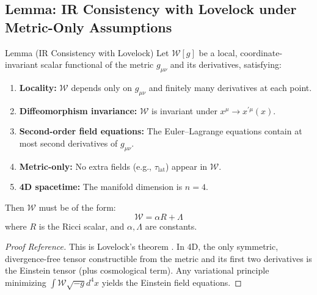 
\subsection{Lemma: IR Consistency with Lovelock under Metric-Only Assumptions}
\label{lemma:lovelock-consistency}

\begin{mytheorem}{Lemma (IR Consistency with Lovelock)}
\label{lemma:lovelock}
Let $\mathcal{W}[g]$ be a local, coordinate-invariant scalar functional of the metric $g_{\mu\nu}$ and its derivatives, satisfying:
\begin{enumerate}[label=(L\arabic*)]
    \item \textbf{Locality:} $\mathcal{W}$ depends only on $g_{\mu\nu}$ and finitely many derivatives at each point.
    \item \textbf{Diffeomorphism invariance:} $\mathcal{W}$ is invariant under $x^\mu \to x^{\prime\mu}(x)$.
    \item \textbf{Second-order field equations:} The Euler--Lagrange equations contain at most second derivatives of $g_{\mu\nu}$.
    \item \textbf{Metric-only:} No extra fields (e.g., $\tau_{\mathrm{lat}}$) appear in $\mathcal{W}$.
    \item \textbf{4D spacetime:} The manifold dimension is $n=4$.
\end{enumerate}
Then $\mathcal{W}$ must be of the form:
\begin{equation}
\mathcal{W} = \alpha R + \Lambda
\end{equation}
where $R$ is the Ricci scalar, and $\alpha, \Lambda$ are constants.
\end{mytheorem}

\begin{proof}[Proof Reference]
This is Lovelock's theorem \cite{Lovelock1971}. In 4D, the only symmetric, divergence-free tensor constructible from the metric and its first two derivatives is the Einstein tensor (plus cosmological term). Any variational principle minimizing $\int \mathcal{W} \sqrt{-g} d^4x$ yields the Einstein field equations.
\end{proof}

